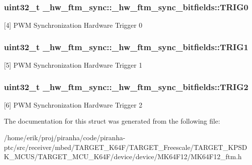 \subsubsection[{\texorpdfstring{T\+R\+I\+G0}{TRIG0}}]{\setlength{\rightskip}{0pt plus 5cm}uint32\+\_\+t \+\_\+hw\+\_\+ftm\+\_\+sync\+::\+\_\+hw\+\_\+ftm\+\_\+sync\+\_\+bitfields\+::\+T\+R\+I\+G0}\hypertarget{struct__hw__ftm__sync_1_1__hw__ftm__sync__bitfields_a5322fd5a4586d08fa00182e3d739e8da}{}\label{struct__hw__ftm__sync_1_1__hw__ftm__sync__bitfields_a5322fd5a4586d08fa00182e3d739e8da}
\mbox{[}4\mbox{]} P\+WM Synchronization Hardware Trigger 0 
\subsubsection[{\texorpdfstring{T\+R\+I\+G1}{TRIG1}}]{\setlength{\rightskip}{0pt plus 5cm}uint32\+\_\+t \+\_\+hw\+\_\+ftm\+\_\+sync\+::\+\_\+hw\+\_\+ftm\+\_\+sync\+\_\+bitfields\+::\+T\+R\+I\+G1}\hypertarget{struct__hw__ftm__sync_1_1__hw__ftm__sync__bitfields_ac6a31a466c50bb16ec45521116caf71b}{}\label{struct__hw__ftm__sync_1_1__hw__ftm__sync__bitfields_ac6a31a466c50bb16ec45521116caf71b}
\mbox{[}5\mbox{]} P\+WM Synchronization Hardware Trigger 1 
\subsubsection[{\texorpdfstring{T\+R\+I\+G2}{TRIG2}}]{\setlength{\rightskip}{0pt plus 5cm}uint32\+\_\+t \+\_\+hw\+\_\+ftm\+\_\+sync\+::\+\_\+hw\+\_\+ftm\+\_\+sync\+\_\+bitfields\+::\+T\+R\+I\+G2}\hypertarget{struct__hw__ftm__sync_1_1__hw__ftm__sync__bitfields_a3f970aa073d94c19ab570ca1f01fd014}{}\label{struct__hw__ftm__sync_1_1__hw__ftm__sync__bitfields_a3f970aa073d94c19ab570ca1f01fd014}
\mbox{[}6\mbox{]} P\+WM Synchronization Hardware Trigger 2 

The documentation for this struct was generated from the following file\+:\begin{DoxyCompactItemize}
\item 
/home/erik/proj/piranha/code/piranha-\/ptc/src/receiver/mbed/\+T\+A\+R\+G\+E\+T\+\_\+\+K64\+F/\+T\+A\+R\+G\+E\+T\+\_\+\+Freescale/\+T\+A\+R\+G\+E\+T\+\_\+\+K\+P\+S\+D\+K\+\_\+\+M\+C\+U\+S/\+T\+A\+R\+G\+E\+T\+\_\+\+M\+C\+U\+\_\+\+K64\+F/device/device/\+M\+K64\+F12/M\+K64\+F12\+\_\+ftm.\+h\end{DoxyCompactItemize}
